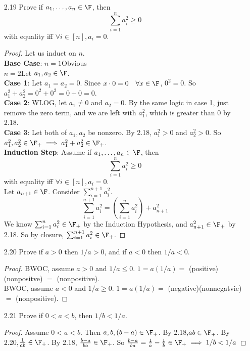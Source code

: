 \documentclass[12pt]{article}
\begin{document}
\begin{enumerate}
		\begin{proof}
			\textbf{Case 1}: $a>0$. Since $\F$ is an ordered field, $a\in\F_+ \implies a\cdot a\in\F_+ \implies a^2>0$.
			\textbf{Case 2}: $a<0$. Since $\F$ is an ordered field, $a\in\F_- \implies -a\in\F_+ \implies \\ (-a)(-a)\in\F_+ \implies (-a)^2\in\F_+ \implies a^2>0$.
		\end{proof}
		\item[2.19] Prove if $a_1,\ldots,a_n \in \F$, then \[\sum_{i=1}^{n}a_i^2 \geq 0\]
		with equality iff $\forall i \in [n], a_i=0$.
		\begin{proof}
			Let us induct on $n$.
			\\\textbf{Base Case}: $n=1$\qquad Obvious\\
			$n=2$\qquad Let $a_1,a_2\in\F$.\\
			\textbf{Case 1}: Let $a_1 = a_2 = 0$. Since $x\cdot0 = 0\quad\forall x\in\F$, $0^2 = 0$. So $a_1^2 + a_2^2 = 0^2 + 0^2 = 0+0=0$.
			\\\textbf{Case 2}: WLOG, let $a_1 \neq 0$ and $a_2=0$. By the same logic in case 1, just remove the zero term, and we are left with $a_1^2$, which is greater than 0 by 2.18.
			\\\textbf{Case 3}: Let both of $a_1,a_2$ be nonzero. By 2.18, $a_1^2>0$ and $a_2^2>0$. So $a_1^2,a_2^2\in\F_+ \implies a_1^2+a_2^2 \in \F_+$.
			\\\textbf{Induction Step}: Assume if $a_1,\ldots,a_n \in \F$, then \[\sum_{i=1}^{n}a_i^2 \geq 0\]
			with equality iff $\forall i \in [n], a_i=0$.\\
			Let $a_{n+1} \in \F$. Consider $\sum_{i=1}^{n+1}a_i^2$.
			\[\sum_{i=1}^{n+1}a_i^2 = (\sum_{i=1}^{n}a_i^2) + a_{n+1}^2\]
			We know $\sum_{i=1}^{n}a_i^2 \in\F_+$ by the Induction Hypothesis, and $a_{n+1}^2\in\F_+$ by 2.18. So by closure, $\sum_{i=1}^{n+1}a_i^2 \in\F_+$.
		\end{proof}
		\item[2.20] Prove if $a>0$ then $1/a > 0$, and if $a<0$ then $1/a<0$.
		\begin{proof}
			BWOC, assume $a>0$ and $1/a \leq 0$. $1 = a(1/a) =$ (positive)(nonpositve) $=$ (nonpositive). \contra\\
			BWOC, assume $a<0$ and $1/a \geq 0$. $1 = a(1/a) =$ (negative)(nonnegatvie) $=$ (nonpositive). \contra
		\end{proof}
		\item[2.21] Prove if $0 < a < b$, then $1/b < 1/a$.
		\begin{proof}
			Assume $0<a<b$. Then $a,b,(b-a)\in\F_+$. By 2.18,\enspace$ab\in\F_+$. By 2.20,\enspace$\frac{1}{ab}\in\F_+$. By 2.18, \enspace$\frac{b-a}{ba} \in\F_+$. So $\frac{b-a}{ba} = \frac{1}{a} - \frac{1}{b} \in\F_+ \implies 1/b < 1/a$

\end{proof}
\end{enumerate}
\end{document}
